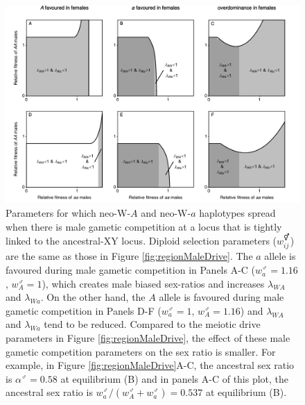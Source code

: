 \documentclass[12pt]{article}
\begin{document}
\newpage
\begin{figure}[!h]
\centering
\centerline{\includegraphics[width=\linewidth]{Region_Plot_combined_MaleGS}}
\caption{
Parameters for which neo-W-$A$ and neo-W-$a$ haplotypes spread when there is male gametic competition at a locus that is tightly linked to the ancestral-XY locus.
Diploid selection parameters ($w_{ij}^\Hermaphrodite$) are the same as those in Figure \ref{fig:regionMaleDrive}. 
The $a$ allele is favoured during male gametic competition in Panels A-C ($w_{a}^\male=1.16$, $w_{A}^\male=1$), which creates male biased sex-ratios and increases $\lambda_{WA}$ and $\lambda_{Wa}$. 
On the other hand, the $A$ allele is favoured during male gametic competition in Panels D-F ($w_{a}^\male=1$, $w_{A}^\male=1.16$) and $\lambda_{WA}$ and $\lambda_{Wa}$ tend to be reduced. 
Compared to the meiotic drive parameters in Figure \ref{fig:regionMaleDrive}, the effect of these male gametic competition parameters on the sex ratio is smaller. 
For example, in Figure \ref{fig:regionMaleDrive}A-C, the ancestral sex ratio is $\alpha^\male=0.58$ at equilibrium (B) and in panels A-C of this plot, the ancestral sex ratio is $w_{a}^\male/(w_{A}^\male+w_{a}^\male)=0.537$ at equilibrium (B). 
}
\label{fig:regionMaleGS}
\end{figure}
\end{document}
